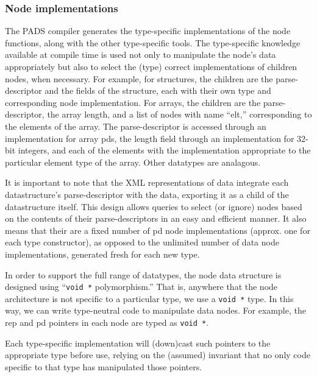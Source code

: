 {\subsubsection{Node implementations}
The PADS compiler generates the type-specific implementations of the
node functions, along with the other type-specific tools.  The
type-specific knowledge available at compile time is used not only to
manipulate the node's data appropriately but also to select the (type)
correct implementations of children nodes, when necessary.  For
example, for structures, the children are the parse-descriptor and the
fields of the structure, each with their own type and corresponding
node implementation.  For arrays, the children are the
parse-descriptor, the array length, and a list of nodes with name
``elt,'' corresponding to the elements of the array. The
parse-descriptor is accessed through an implementation for array pds,
the length field through an implementation for 32-bit integers, and
each of the elements with the implementation appropriate to the
particular element type of the array. Other datatypes are analagous.

It is important to note that the XML representations of \pads{} data
integrate each datastructure's parse-descriptor with the data,
exporting it as a child of the datastructure itself. This design
allows queries to select (or ignore) nodes based on the contents of
their parse-descriptors in an easy and efficient manner. It also means
that their are a fixed number of pd node implementations (approx. one for
each type constructor), as opposed to the unlimited number of data
node implementations, generated fresh for each new \pads{} type.

In order to support the full range of \pads{} datatypes,
the node data structure is designed using ``{\tt void *}
polymorphism.'' That is, anywhere that the node architecture is not
specific to a particular type, we use a {\tt void *} type. In this
way, we can write type-neutral code to manipulate data nodes. For
example, the rep and pd pointers in each node are typed as {\tt void
  *}. 

Each type-specific implementation will (down)cast such pointers to the
appropriate type before use, relying on the (assumed) invariant that
no only code specific to that type has manipulated those pointers.
}


